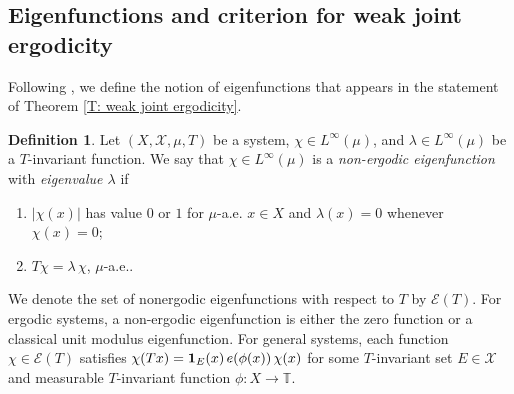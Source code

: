 \documentclass[11pt]{amsart}
\theoremstyle{definition}
\newtheorem*{definition}{Definition}
\newcommand{\T}{{\mathbb T}}
\newcommand{\CE}{{\mathcal E}}
\newcommand{\CX}{{\mathcal X}}
\begin{document}
\subsection{Eigenfunctions and criterion for weak joint ergodicity}\label{SS:eigenfunctions}
Following \cite{FH18}, 	we  define the notion of eigenfunctions that appears in the statement of Theorem \ref{T: weak joint ergodicity}.
	\begin{definition}
			Let  $(X, \CX, \mu,T)$ be a system,  $\chi\in L^\infty(\mu)$, and  $\lambda\in L^\infty(\mu)$ be a $T$-invariant function. We say that $\chi\in L^\infty(\mu)$ is a {\em non-ergodic eigenfunction}
			with {\em eigenvalue $\lambda$} if
			\begin{enumerate}
                \item $|\chi(x)|$ has value $0$ or $1$ for $\mu$-a.e. $x\in X$ and $\lambda(x)=0$ whenever $\chi(x)=0$;
                \item $T\chi=\lambda\, \chi$, $\mu$-a.e..
			 \end{enumerate}
		\end{definition}
		We denote the set of nonergodic eigenfunctions with respect to $T$ by $\CE(T)$.
		 For ergodic systems, a non-ergodic eigenfunction is either the  zero function  or  a classical  unit modulus eigenfunction.
		 For general systems, each function $\chi\in \CE(T)$ satisfies $\chi(Tx)={\bf 1}_E(x) \, e(\phi(x))\, \chi(x)$ for some $T$-invariant set $E\in \CX$ and measurable $T$-invariant function $\phi \colon X\to \T$.
\end{document}
